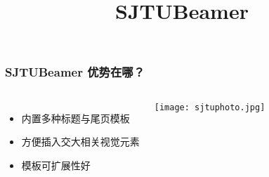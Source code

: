 \documentclass[aspectratio=169,draft]{ctexbeamer}
\begin{document}
    \title{SJTUBeamer}
    \begin{frame}
    \frametitle{SJTUBeamer 优势在哪？}
    \begin{columns}
    \begin{itemize}
    \item 内置多种标题与尾页模板
    \item 方便插入交大相关视觉元素
    \item 模板可扩展性好
    \end{itemize}
    \texttt{[image: sjtuphoto.jpg]}
    \end{columns}
    \end{frame}
\end{document}
